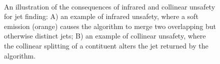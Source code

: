 \begin{figure}[htbp]
  \centering
  \mbox{
     \qquad
     \qquad
  }
  \caption[Infrared and Collinear Unsafety]{An illustration of the consequences of infrared and collinear unsafety for jet finding: A) an example of infrared unsafety, where a soft emission (orange) causes the algorithm to merge two overlapping but otherwise distinct jets; B) an example of collinear unsafety, where the collinear splitting of a contituent alters the jet returned by the algorithm.}
    \label{fig:IRCunsafe}
\end{figure}

